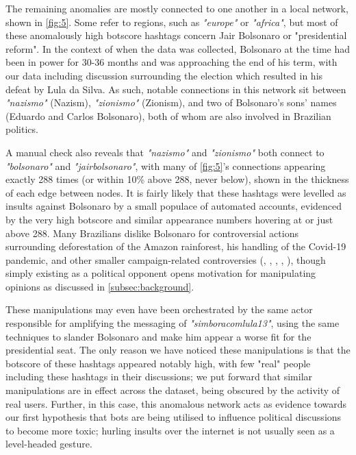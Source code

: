 \documentclass[a4paper,11pt]{article}  %
\begin{document}
	The remaining anomalies are mostly connected to one another in a local network, shown in \autoref{fig:5}. Some refer to regions, such as \textit{"europe"} or \textit{"africa"}, but most of these anomalously high botscore hashtags concern Jair Bolsonaro or "presidential reform". In the context of when the data was collected, Bolsonaro at the time had been in power for 30-36 months and was approaching the end of his term, with our data including discussion surrounding the election which resulted in his defeat by Lula da Silva. As such, notable connections in this network sit between \textit{"nazismo"} (Nazism), \textit{"zionismo"} (Zionism), and two of Bolsonaro's sons' names (Eduardo and Carlos Bolsonaro), both of whom are also involved in Brazilian politics. 
	
	A manual check also reveals that \textit{"nazismo"} and \textit{"zionismo"} both connect to \textit{"bolsonaro"} and \textit{"jairbolsonaro"}, with many of \autoref{fig:5}'s connections appearing exactly 288 times (or within 10\% above 288, never below), shown in the thickness of each edge between nodes. It is fairly likely that these hashtags were levelled as insults against Bolsonaro by a small populace of automated accounts, evidenced by the very high botscore and similar appearance numbers hovering at or just above 288. Many Brazilians dislike Bolsonaro for controversial actions surrounding deforestation of the Amazon rainforest, his handling of the Covid-19 pandemic, and other smaller campaign-related controversies (\parencite{BrazilianAmazonDeforestation}, \parencite{trevisaniBrazilBolsonaroFires2019}, \parencite{dupeyronJustTrumpBrazil2020}, \parencite{BrazilMilitaryChiefs2021}, \parencite{phillipsBrazilJairBolsonaro2018}), though simply existing as a political opponent opens motivation for manipulating opinions as discussed in \autoref{subsec:background}. 
	
	These manipulations may even have been orchestrated by the same actor responsible for amplifying the messaging of \textit{"simboracomlula13"}, using the same techniques to slander Bolsonaro and make him appear a worse fit for the presidential seat. The only reason we have noticed these manipulations is that the botscore of these hashtags appeared notably high, with few "real" people including these hashtags in their discussions; we put forward that similar manipulations are in effect across the dataset, being obscured by the activity of real users. Further, in this case, this anomalous network acts as evidence towards our first hypothesis that bots are being utilised to influence political discussions to become more toxic; hurling insults over the internet is not usually seen as a level-headed gesture.
	
\end{document}
